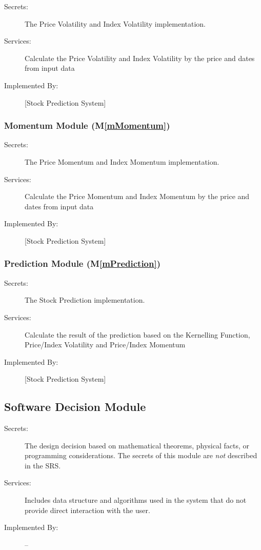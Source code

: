 \documentclass[12pt, titlepage]{article}
\newcommand{\mref}[1]{M\ref{#1}}
\begin{document}
\begin{description}
\item[Secrets:] The Price Volatility and Index Volatility implementation.
\item[Services:] Calculate the Price Volatility and Index Volatility by the price and dates from input data
\item[Implemented By:] [Stock Prediction System]
\end{description}


\subsubsection{Momentum Module (\mref{mMomentum})}

\begin{description}
\item[Secrets:] The Price Momentum and Index Momentum implementation.
\item[Services:]Calculate the Price Momentum and Index Momentum by the price and dates from input data
\item[Implemented By:] [Stock Prediction System]
\end{description}


\subsubsection{Prediction Module (\mref{mPrediction})}
\begin{description}
\item[Secrets:]The Stock Prediction implementation.
\item[Services:] Calculate the result of the prediction based on the Kernelling Function, Price/Index Volatility and Price/Index Momentum
\item[Implemented By:] [Stock Prediction System]
\end{description}


\subsection{Software Decision Module}

\begin{description}
\item[Secrets:] The design decision based on mathematical theorems, physical
facts, or programming considerations. The secrets of this module are
\emph{not} described in the SRS.
\item[Services:] Includes data structure and algorithms used in the system that
do not provide direct interaction with the user. 
\item[Implemented By:] --
\end{description}
\end{document}

